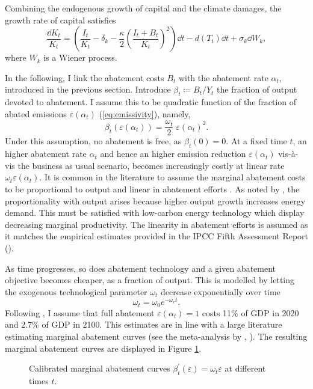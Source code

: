 \documentclass[../../main.tex]{subfiles}
\begin{document}
Combining the endogenous growth of capital and the climate damages, the growth rate of capital satisfies \begin{equation} \label{eq:growth-capital:nominal}
    \frac{\dd{K}_t}{K_t} = \left(\frac{I_t}{K_t} - \delta_k - \frac{\kappa}{2} \left( \frac{I_t + B_t}{K_t} \right)^2 \right) \dd{t} - d(T_t) \dd{t} + \sigma_k \dd{W}_k,
\end{equation} where $W_k$ is a Wiener process.


In the following, I link the abatement costs $B_t$ with the abatement rate $\alpha_t$, introduced in the previous section. Introduce $\beta_t \coloneqq B_t / Y_t$ the fraction of output devoted to abatement. I assume this to be quadratic function of the fraction of abated emissions $\varepsilon(\alpha_t)$ (\ref{eq:emissivity}), namely, \begin{equation} \label{eq:abatement-costs}
    \beta_t(\varepsilon(\alpha_t)) = \frac{\omega_t}{2} \; \varepsilon(\alpha_t)^2.
\end{equation} Under this assumption, no abatement is free, as $\beta_t(0) = 0$. At a fixed time $t$, an higher abatement rate $\alpha_t$ and hence an higher emission reduction $\varepsilon(\alpha_t)$ vis-à-vis the business as usual scenario, becomes increasingly costly at linear rate $\omega_t \varepsilon(\alpha_t)$. It is common in the literature to assume the marginal abatement costs to be proportional to output and linear in abatement efforts \citep{nordhaus_optimal_1992,nordhaus_revisiting_2017,baker_technical_2008, dietz_cumulative_2019}. As noted by \citet[p.112-113]{dietz_cumulative_2019}, the proportionality with output arises because higher output growth increases energy demand. This must be satisfied with low-carbon energy technology which display decreasing marginal productivity. The linearity in abatement efforts is assumed as it matches the empirical estimates provided in the IPCC Fifth Assessment Report (\citeyear{ipcc_climate_2023}).

As time progresses, so does abatement technology and a given abatement objective becomes cheaper, as a fraction of output. This is modelled by letting the exogenous technological parameter $\omega_t$ decrease exponentially over time \begin{equation}
    \omega_t = \omega_0 e^{-\omega_r t}.
\end{equation} Following \citep{nordhaus_revisiting_2017}, I assume that full abatement $\varepsilon(\alpha_t) = 1$ costs 11\% of GDP in 2020 and 2.7\% of GDP in 2100. This estimates are in line with a large literature estimating marginal abatement curves (see the meta-analysis by \citeauthor{kuik_marginal_2009}, \citeyear{kuik_marginal_2009}). The resulting marginal abatement curves are displayed in Figure \ref{fig:mac}. \begin{figure}[htbp]
    \centering
    
    \caption{Calibrated marginal abatement curves $\beta_t^\prime(\varepsilon) = \omega_t \varepsilon$ at different times $t$.}
    \label{fig:mac}
\end{figure}
\end{document}

